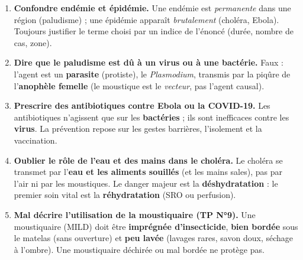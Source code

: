 \documentclass[11pt]{article}
\begin{document}
\begin{attention}
\begin{enumerate}
\item \textbf{Confondre endémie et épidémie.} Une endémie est \emph{permanente} dans une région (paludisme) ; une épidémie apparaît \emph{brutalement} (choléra, Ebola). Toujours justifier le terme choisi par un indice de l'énoncé (durée, nombre de cas, zone).
\item \textbf{Dire que le paludisme est dû à un virus ou à une bactérie.} Faux : l'agent est un \textbf{parasite} (protiste), le \emph{Plasmodium}, transmis par la piqûre de l'\textbf{anophèle femelle} (le moustique est le \emph{vecteur}, pas l'agent causal).
\item \textbf{Prescrire des antibiotiques contre Ebola ou la COVID-19.} Les antibiotiques n'agissent que sur les \textbf{bactéries} ; ils sont inefficaces contre les \textbf{virus}. La prévention repose sur les gestes barrières, l'isolement et la vaccination.
\item \textbf{Oublier le rôle de l'eau et des mains dans le choléra.} Le choléra se transmet par l'\textbf{eau et les aliments souillés} (et les mains sales), pas par l'air ni par les moustiques. Le danger majeur est la \textbf{déshydratation} : le premier soin vital est la \textbf{réhydratation} (SRO ou perfusion).
\item \textbf{Mal décrire l'utilisation de la moustiquaire (TP N°9).} Une moustiquaire (MILD) doit être \textbf{imprégnée d'insecticide}, \textbf{bien bordée} sous le matelas (sans ouverture) et \textbf{peu lavée} (lavages rares, savon doux, séchage à l'ombre). Une moustiquaire déchirée ou mal bordée ne protège pas.
\end{enumerate}
\end{attention}
\end{document}
